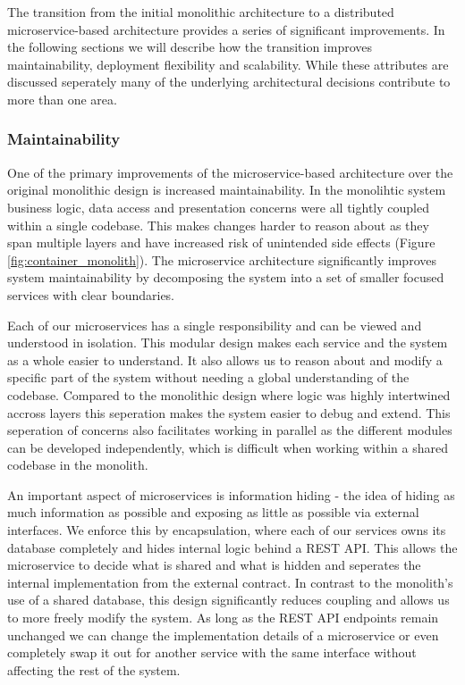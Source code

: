 The transition from the initial monolithic architecture to a distributed microservice-based architecture
provides a series of significant improvements. 
In the following sections we will describe how the transition improves maintainability, deployment flexibility and scalability.
While these attributes are discussed seperately many of the underlying architectural decisions
contribute to more than one area.

\subsubsection{Maintainability}

One of the primary improvements of the microservice-based architecture over the 
original monolithic design is increased maintainability.
In the monolihtic system business logic, data access and presentation concerns were
all tightly coupled within a single codebase. This makes changes harder to reason about
as they span multiple layers and have increased risk of unintended side effects (Figure \ref{fig:container_monolith}).
The microservice architecture significantly improves system maintainability by decomposing the 
system into a set of smaller focused services with clear boundaries.

Each of our microservices has a single responsibility and can be viewed and understood in isolation. 
This modular design makes each service and the system as a whole easier to understand.
It also allows us to reason about and modify a specific part of the system without needing a global
understanding of the codebase.
Compared to the monolithic design where logic was highly intertwined accross layers this seperation
makes the system easier to debug and extend.
This seperation of concerns also facilitates working in parallel as the different modules can be developed 
independently, which is difficult when working within a shared codebase in the monolith.

An important aspect of microservices is information hiding - the idea of 
hiding as much information as possible and exposing as little as possible via external interfaces.
We enforce this by encapsulation, where each of our services owns its database completely and hides 
internal logic behind a REST API.
This allows the microservice to decide what is shared and what is hidden and seperates the internal implementation from the external contract.
In contrast to the monolith's use of a shared database, this design significantly reduces coupling
and allows us to more freely modify the system.
As long as the REST API endpoints remain unchanged we can change the implementation details
of a microservice or even completely swap it out for another service with the same interface
without affecting the rest of the system.


